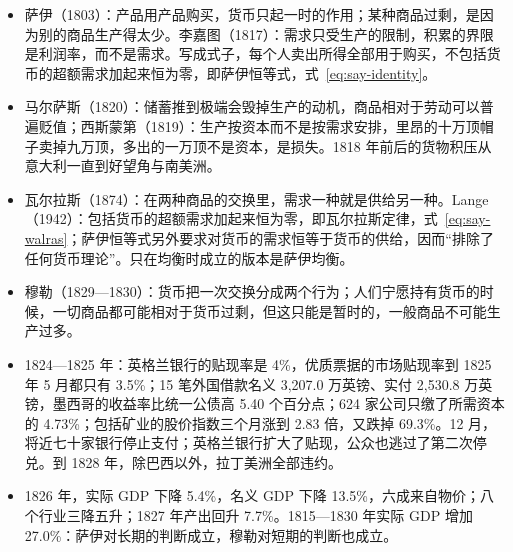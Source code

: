 \begin{takeaways}
\begin{itemize}
\item 萨伊（1803）：产品用产品购买，货币只起一时的作用；某种商品过剩，是因为别的商品生产得太少。李嘉图（1817）：需求只受生产的限制，积累的界限是利润率，而不是需求。写成式子，每个人卖出所得全部用于购买，不包括货币的超额需求加起来恒为零，即萨伊恒等式，式~\eqref{eq:say-identity}。
\item 马尔萨斯（1820）：储蓄推到极端会毁掉生产的动机，商品相对于劳动可以普遍贬值；西斯蒙第（1819）：生产按资本而不是按需求安排，里昂的十万顶帽子卖掉九万顶，多出的一万顶不是资本，是损失。1818 年前后的货物积压从意大利一直到好望角与南美洲。
\item 瓦尔拉斯（1874）：在两种商品的交换里，需求一种就是供给另一种。Lange（1942）：包括货币的超额需求加起来恒为零，即瓦尔拉斯定律，式~\eqref{eq:say-walras}；萨伊恒等式另外要求对货币的需求恒等于货币的供给，因而“排除了任何货币理论”。只在均衡时成立的版本是萨伊均衡。
\item 穆勒（1829—1830）：货币把一次交换分成两个行为；人们宁愿持有货币的时候，一切商品都可能相对于货币过剩，但这只能是暂时的，一般商品不可能生产过多。
\item 1824—1825 年：英格兰银行的贴现率是 4\%，优质票据的市场贴现率到 1825 年 5 月都只有 3.5\%；15 笔外国借款名义 3,207.0 万英镑、实付 2,530.8 万英镑，墨西哥的收益率比统一公债高 5.40 个百分点；624 家公司只缴了所需资本的 4.73\%；包括矿业的股价指数三个月涨到 2.83 倍，又跌掉 69.3\%。12 月，将近七十家银行停止支付；英格兰银行扩大了贴现，公众也逃过了第二次停兑。到 1828 年，除巴西以外，拉丁美洲全部违约。
\item 1826 年，实际 GDP 下降 5.4\%，名义 GDP 下降 13.5\%，六成来自物价；八个行业三降五升；1827 年产出回升 7.7\%。1815—1830 年实际 GDP 增加 27.0\%：萨伊对长期的判断成立，穆勒对短期的判断也成立。
\end{itemize}
\end{takeaways}

